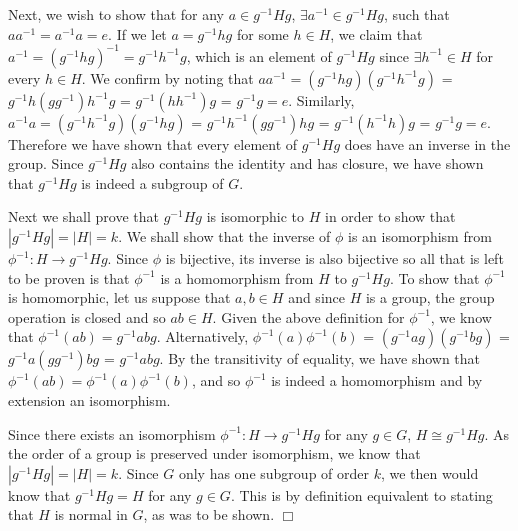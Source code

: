 \documentclass[12pt,letterpaper,reqno]{amsart}
\begin{document}
\begin{enumerate}
\begin{flushleft}
Next, we wish to show that for any $a \in g^{-1}Hg$, $\exists a^{-1} \in g^{-1}Hg$, such that $aa^{-1} = a^{-1}a = e$. If we let $a = g^{-1}hg$ for some $h \in H$, we claim that $a^{-1} = (g^{-1}hg)^{-1} = g^{-1}h^{-1}g$, which is an element of $g^{-1}Hg$ since $\exists h^{-1} \in H$ for every $h \in H$. We confirm by noting that $aa^{-1} = (g^{-1}hg)(g^{-1}h^{-1}g)$ = $g^{-1}h(gg^{-1})h^{-1}g$ = $g^{-1}(hh^{-1})g$ = $g^{-1}g = e$. Similarly, $a^{-1}a = (g^{-1}h^{-1}g)(g^{-1}hg)$ = $g^{-1}h^{-1}(gg^{-1})hg$ = $g^{-1}(h^{-1}h)g$ = $g^{-1}g = e$. Therefore we have shown that every element of $g^{-1}Hg$ does have an inverse in the group. Since $g^{-1}Hg$ also contains the identity and has closure, we have shown that $g^{-1}Hg$ is indeed a subgroup of $G$.
\newline

Next we shall prove that $g^{-1}Hg$ is isomorphic to $H$ in order to show that $|g^{-1}Hg| = |H| = k$. We shall show that the inverse of $\phi$ is an isomorphism from $\phi^{-1}: H \rightarrow g^{-1}Hg$. Since $\phi$ is bijective, its inverse is also bijective so all that is left to be proven is that $\phi^{-1}$ is a homomorphism from $H$ to $g^{-1}Hg$. To show that $\phi^{-1}$ is homomorphic, let us suppose that $a, b \in H$ and since $H$ is a group, the group operation is closed and so $ab \in H$. Given the above definition for $\phi^{-1}$, we know that $\phi^{-1}(ab) = g^{-1}abg$. Alternatively, $\phi^{-1}(a)\phi^{-1}(b)$ = $(g^{-1}ag)(g^{-1}bg)$ = $g^{-1}a(gg^{-1})bg$ = $g^{-1}abg$. By the transitivity of equality, we have shown that $\phi^{-1}(ab) = \phi^{-1}(a)\phi^{-1}(b)$, and so $\phi^{-1}$ is indeed a homomorphism and by extension an isomorphism.
\newline

Since there exists an isomorphism $\phi^{-1} : H \rightarrow g^{-1}Hg$ for any $g \in G$, $H \cong g^{-1}Hg$. As the order of a group is preserved under isomorphism, we know that $|g^{-1}Hg| = |H| = k$. Since $G$ only has one subgroup of order $k$, we then would know that $g^{-1}Hg = H$ for any $g \in G$. This is by definition equivalent to stating that $H$ is normal in $G$, as was to be shown. $\Box$
 
\end{flushleft}

\end{enumerate}
\end{document}
